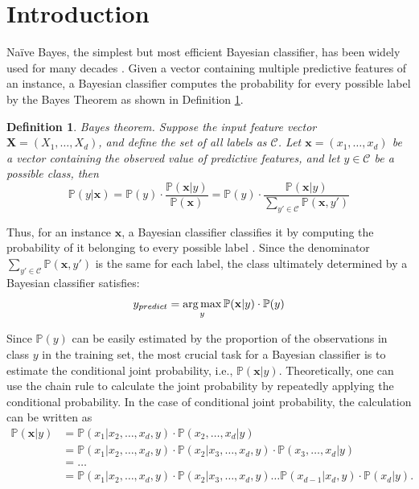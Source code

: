 \documentclass[twoside,11pt]{article}
\newtheorem{definition}{Definition}[subsection]
\begin{document}
\section{Introduction}
Na\"ive Bayes, the simplest but most efficient Bayesian classifier, has been widely used for many decades \citep{lewis1998naive, domingos1997optimality}. Given a vector containing multiple predictive features of an instance, a Bayesian classifier computes the probability for every possible label by the Bayes Theorem as shown in Definition \ref{def:1}.

\begin{definition}{Bayes theorem.}
\label{def:1}
 Suppose the input feature vector $\mathbf{X} = (X_1,\dots,X_d)$, and define the set of all labels as $\mathcal{C}$. Let $\mathbf{x}=(x_1,\dots,x_d)$ be a vector containing the observed value of predictive features, and let $y\in\mathcal{C}$ be a possible class, then
\begin{equation*}
    \mathbb{P}(y|\mathbf{x}) = \mathbb{P}(y)\cdot\frac{\mathbb{P}(\mathbf{x}|y)}{\mathbb{P}(\mathbf{x})}=\mathbb{P}(y)\cdot\frac{\mathbb{P}(\mathbf{x}|y)}{\sum_{y'\in\mathcal{C}}\mathbb{P}(\mathbf{x},y')}
\end{equation*}
\end{definition}

Thus, for an instance $\mathbf{x}$, a Bayesian classifier classifies it by computing the probability of it belonging to every possible label \citep{duda1973pattern}. Since the denominator $\sum_{y'\in\mathcal{C}}\mathbb{P}(\mathbf{x},y')$ is the same for each label, the class ultimately determined by a Bayesian classifier satisfies:
\begin{equation*}
    \label{eq:1}
    \centering
    y_{predict}=\mathop{\arg\max}\limits_{y} \mathbb{P}(\mathbf{x}|y)\cdot\mathbb{P}(y)
\end{equation*}

Since $\mathbb{P}(y)$ can be easily estimated by the proportion of the observations in class $y$ in the training set, the most crucial task for a Bayesian classifier is to estimate the conditional joint probability, i.e.,  $\mathbb{P}(\mathbf{x}|y)$. Theoretically, one can use the chain rule to calculate the joint probability by repeatedly applying the conditional probability. In the case of conditional joint probability, the calculation can be written as 
\begin{equation}
\begin{aligned}
    \mathbb{P}(\mathbf{x}|y) &= \mathbb{P}(x_1|x_2,\dots,x_d,y)\cdot\mathbb{P}(x_2,\dots,x_d|y) \\
    &=\mathbb{P}(x_1|x_2,\dots,x_d,y)\cdot\mathbb{P}(x_2|x_3,\dots,x_d,y)\cdot\mathbb{P}(x_3,\dots,x_d|y)\\
    &=\dots \\
    &=\mathbb{P}(x_1|x_2,\dots,x_d,y)\cdot\mathbb{P}(x_2|x_3,\dots,x_d,y)\dots\mathbb{P}(x_{d-1}|x_d,y)\cdot\mathbb{P}(x_d|y).\\
\end{aligned}
\label{actual_computation}
\end{equation}
\end{document}

